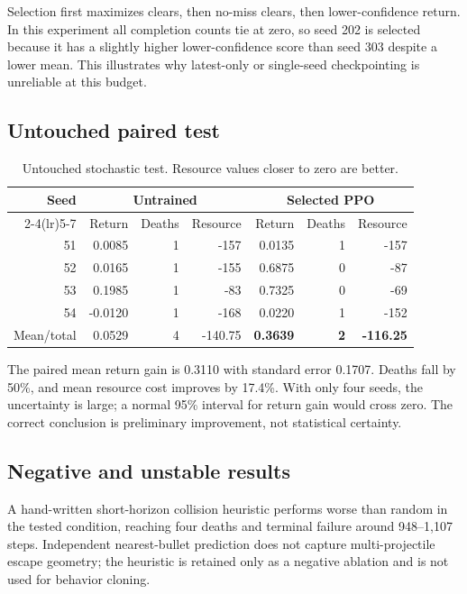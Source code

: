 \documentclass[10pt]{article}
\begin{document}
Selection first maximizes clears, then no-miss clears, then lower-confidence
return.  In this experiment all completion counts tie at zero, so seed 202 is
selected because it has a slightly higher lower-confidence score than seed 303
despite a lower mean.  This illustrates why latest-only or single-seed
checkpointing is unreliable at this budget.

\subsection{Untouched paired test}

\begin{table}[ht]
  \centering
  \caption{Untouched stochastic test.  Resource values closer to zero are
  better.}
  \label{tab:test}
  \begin{tabular}{rrrrrrr}
    \toprule
    Seed & \multicolumn{3}{c}{Untrained} & \multicolumn{3}{c}{Selected PPO} \\
    \cmidrule(lr){2-4}\cmidrule(lr){5-7}
      & Return & Deaths & Resource & Return & Deaths & Resource \\
    \midrule
    51 & 0.0085 & 1 & -157 & 0.0135 & 1 & -157 \\
    52 & 0.0165 & 1 & -155 & 0.6875 & 0 & -87 \\
    53 & 0.1985 & 1 & -83  & 0.7325 & 0 & -69 \\
    54 & -0.0120 & 1 & -168 & 0.0220 & 1 & -152 \\
    \midrule
    Mean/total & 0.0529 & 4 & -140.75 & \textbf{0.3639} & \textbf{2} & \textbf{-116.25} \\
    \bottomrule
  \end{tabular}
\end{table}

The paired mean return gain is 0.3110 with standard error 0.1707.  Deaths fall
by 50\%, and mean resource cost improves by 17.4\%.  With only four seeds, the
uncertainty is large; a normal 95\% interval for return gain would cross zero.
The correct conclusion is preliminary improvement, not statistical certainty.

\subsection{Negative and unstable results}

A hand-written short-horizon collision heuristic performs worse than random in
the tested condition, reaching four deaths and terminal failure around
948--1,107 steps.  Independent nearest-bullet prediction does not capture
multi-projectile escape geometry; the heuristic is retained only as a negative
ablation and is not used for behavior cloning.
\end{document}

